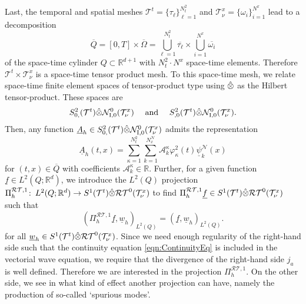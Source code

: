 \documentclass[a4paper,11pt]{article}
\newcommand{\R}{\mathbb R}
\renewcommand{\vec}[1]{\underline{#1}}
\begin{document}
Last, the temporal and spatial meshes $\mathcal T^t = \{ \tau_\ell \}_{\ell=1}^{N_t^2}$ and $\mathcal T^x_\nu = \{ \omega_i \}_{i=1}^{N^x}$ lead to a decomposition
\begin{equation*}
	\overline{Q} = [0,T] \times \overline{\Omega} = \bigcup_{\ell=1}^{N_t^2} \overline{\tau_\ell} \times \bigcup_{i=1}^{N^x} \overline{\omega_i}
\end{equation*}
of the space-time cylinder $Q \subset \R^{d+1}$ with $N_t^2\cdot N^x$ space-time elements. Therefore $\mathcal T^t  \times \mathcal T^x_\nu$ is a space-time tensor product mesh. To this space-time mesh, we relate space-time finite element spaces of tensor-product type using $\hat{\tens}$ as the Hilbert tensor-product. These spaces are
\begin{equation} \label{FES:TPRaueme}
	S_{0,}^2(\mathcal T^t) \hat{\tens}\mathcal N_\mathrm{I,0}^0(\mathcal T^x_\nu) \quad \text{ and } \quad S_{,0}^2(\mathcal T^t) \hat{\tens}\mathcal N_\mathrm{I,0}^0(\mathcal T^x_\nu).
\end{equation}
Then, any function $\vec A_h \in S_{0,}^2(\mathcal T^t) \hat{\tens}\mathcal N_\mathrm{I,0}^0(\mathcal T^x_\nu)$ admits the representation
\begin{equation} \label{eqn:DefAh}
	\vec A_h(t,x) = \sum_{\kappa=1}^{N_t^2} \sum_{k=1}^{N_x^\mathcal{N}} \mathcal A_k^\kappa \varphi^2_\kappa(t) \vec \psi^\mathcal{N}_k(x)
\end{equation}
for $ (t,x) \in \overline{Q}$ with coefficients $\mathcal A_k^\kappa \in \R$. Further, for a given function $\vec f \in L^2(Q; \R^d)$, we introduce the $L^2(Q)$ projection  $\Pi_h^{\mathcal{RT},1} \colon \, L^2(Q; \R^d) \to S^1(\mathcal T^t) \hat{\tens} \mathcal{RT}^0(\mathcal T^x_\nu)$ to find $\Pi_h^{\mathcal{RT},1} \vec f \in S^1(\mathcal T^t) \hat{\tens} \mathcal{RT}^0(\mathcal T^x_\nu)$ such that
\begin{equation} \label{FES:L2RT}
	(\Pi_h^{\mathcal{RT},1} \vec f, \vec w_h)_{L^2(Q)} = (\vec f, \vec w_h)_{L^2(Q)}.
\end{equation}
for all $ \vec w_h \in S^1(\mathcal T^t) \hat{\tens} \mathcal{RT}^0(\mathcal T^x_\nu)$. Since we need enough regularity of the right-hand side such that the continuity equation \eqref{eqn:ContinuityEq} is included in the vectorial wave equation, we require that the divergence of the right-hand side $j_a$ is well defined. Therefore we are interested in the projection $\Pi_h^{\mathcal{RT},1} $. On the other side, we see in \cite{HauserZank2023} what kind of effect another projection can have, namely  the production of so-called `spurious modes'. 
\end{document}
